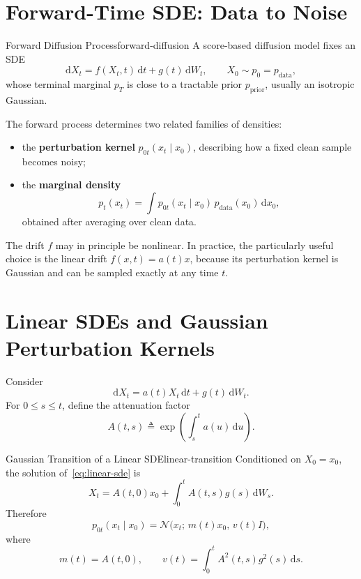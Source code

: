 \documentclass[11pt,a4paper]{article}
\renewcommand{\d}{\mathrm{d}}
\newcommand{\cN}{\mathcal{N}}
\newcommand{\pdata}{p_{\mathrm{data}}}
\newcommand{\pprior}{p_{\mathrm{prior}}}
\begin{document}
\section{Forward-Time SDE: Data to Noise}\label{sec:forward}

\begin{definition}{Forward Diffusion Process}{forward-diffusion}
A score-based diffusion model fixes an SDE
\[
  \d X_t=f(X_t,t)\,\d t+g(t)\,\d W_t,
  \qquad X_0\sim p_0=\pdata,
\]
whose terminal marginal $p_T$ is close to a tractable prior
$\pprior$, usually an isotropic Gaussian.
\end{definition}

The forward process determines two related families of densities:
\begin{itemize}
  \item the \textbf{perturbation kernel} $p_{0t}(x_t\mid x_0)$, describing
        how a fixed clean sample becomes noisy;
  \item the \textbf{marginal density}
        \begin{equation}\label{eq:marginal-mixture}
          p_t(x_t)=\int p_{0t}(x_t\mid x_0)\,\pdata(x_0)\,\d x_0,
        \end{equation}
        obtained after averaging over clean data.
\end{itemize}

The drift $f$ may in principle be nonlinear.  In practice, the particularly
useful choice is the linear drift $f(x,t)=a(t)x$, because its perturbation
kernel is Gaussian and can be sampled exactly at any time $t$.

\section{Linear SDEs and Gaussian Perturbation Kernels}\label{sec:marginals}

Consider
\begin{equation}\label{eq:linear-sde}
  \d X_t=a(t)X_t\,\d t+g(t)\,\d W_t.
\end{equation}
For $0\le s\le t$, define the attenuation factor
\[
  A(t,s)\triangleq\exp\!\left(\int_s^t a(u)\,\d u\right).
\]

\begin{proposition}{Gaussian Transition of a Linear SDE}{linear-transition}
Conditioned on $X_0=x_0$, the solution of~\eqref{eq:linear-sde} is
\[
  X_t=A(t,0)x_0+\int_0^t A(t,s)g(s)\,\d W_s.
\]
Therefore
\begin{equation}\label{eq:gaussian-kernel}
  p_{0t}(x_t\mid x_0)
  =\cN\!\bigl(x_t;\,m(t)x_0,\,v(t)I\bigr),
\end{equation}
where
\begin{equation}\label{eq:mean-var}
  m(t)=A(t,0),
  \qquad
  v(t)=\int_0^t A^2(t,s)g^2(s)\,\d s.
\end{equation}
\end{proposition}
\end{document}
